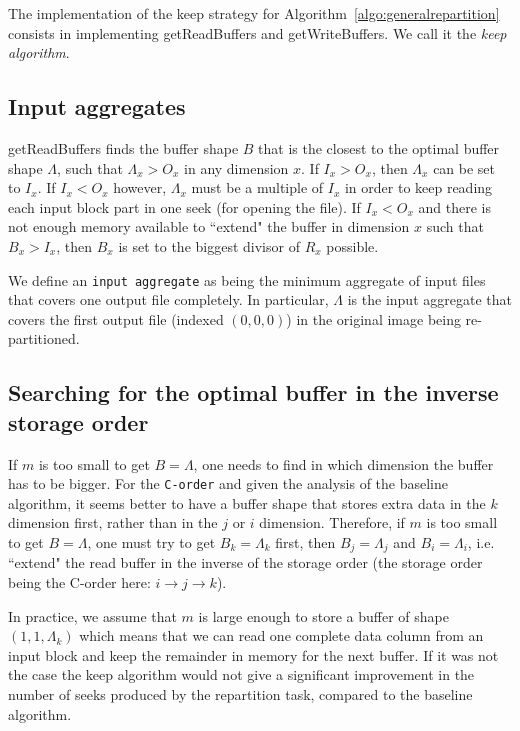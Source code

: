\documentclass[conference]{IEEEtran}
\begin{document}
The implementation of the keep strategy for
Algorithm~\ref{algo:generalrepartition} consists in implementing
getReadBuffers and getWriteBuffers. We call it the \emph{keep algorithm}.

\subsection{Input aggregates}
getReadBuffers finds the buffer shape $B$ that is the closest to the optimal buffer
shape $\Lambda$, such that $\Lambda_x>O_x$ in any dimension $x$.
If $I_x > O_x$, then $\Lambda_x$ can be set to $I_x$. If $I_x < O_x$ however,
$\Lambda_x$ must be a multiple of $I_x$ in order to keep reading each input
block part in one seek (for opening the file).
If $I_x < O_x$ and there is not enough memory available to ``extend"
the buffer in dimension $x$ such that $B_x > I_x$, then $B_x$ is set to the
biggest divisor of $R_x$ possible.

We define an \texttt{input aggregate} as being the minimum aggregate of input
files that covers one output file completely. In particular, $\Lambda$ is the
input aggregate that covers the first output file (indexed $(0,0,0)$) in the
original image being re-partitioned.

\subsection{Searching for the optimal buffer in the inverse storage order}
If $m$ is too small to get $B=\Lambda$, one needs to find in which dimension
the buffer has to be bigger.
For the \texttt{C-order} and given the analysis of the baseline algorithm,
it seems better to have a buffer shape that stores extra data in the $k$
dimension first, rather than in the $j$ or $i$ dimension.
Therefore, if $m$ is too small to get $B=\Lambda$, one must try to get
$B_k=\Lambda_k$ first, then $B_j=\Lambda_j$ and $B_i=\Lambda_i$, i.e. ``extend"
the read buffer in the inverse of the storage order (the storage order being the
C-order here: $i\rightarrow j\rightarrow k$).

In practice, we assume that $m$ is large enough to store a buffer of shape
$(1,1,\Lambda_k)$ which means that we can read one complete data column from an
input block and keep the remainder in memory for the next buffer.
If it was not the case the keep algorithm would not give a significant
improvement in the number of seeks produced by the repartition task, compared
to the baseline algorithm.
\end{document}
